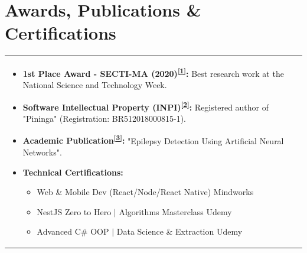 \documentclass[a4paper,8pt]{article}
\begin{document}
\section{Awards, Publications \& Certifications}
\begin{tabularx}{\linewidth}{ @{}X @{} }
    \begin{itemize}[nosep, leftmargin=2em, itemsep=2pt]
        \item \textbf{1st Place Award - SECTI-MA (2020)\textsuperscript{\href{https://www.uema.br/2020/11/projeto-sistema-de-monitoramento-e-previsao-de-falhas-de-ativos-em-ferrovias-e-premiado-na-17a-semana-nacional-de-ciencia-e-tecnologia-do-maranhao/}{[1]}}:} Best research work at the National Science and Technology Week.
        \item \textbf{Software Intellectual Property (INPI)\textsuperscript{\href{https://busca.inpi.gov.br/pePI/servlet/ProgramaServletController?Action=detail\&CodPedido=23317}{[2]}}:} Registered author of "Pininga" (Registration: BR512018000815-1).
        \item \textbf{Academic Publication\textsuperscript{\href{https://scholarsjournal.net/index.php/ijier/article/view/2292}{[3]}}:} "Epilepsy Detection Using Artificial Neural Networks".
        \item \textbf{Technical Certifications:}
        \vspace{2pt}
        \begin{itemize}[label={}, leftmargin=1em, nosep]
            \item Web \& Mobile Dev (React/Node/React Native) \hfill \color[HTML]{371e77} Mindworks
            \item NestJS Zero to Hero $|$ Algorithms Masterclass \hfill \color[HTML]{371e77} Udemy
            \item Advanced C\# OOP $|$ Data Science \& Extraction \hfill \color[HTML]{371e77} Udemy
        \end{itemize}
    \end{itemize}
\end{tabularx}
\end{document}
